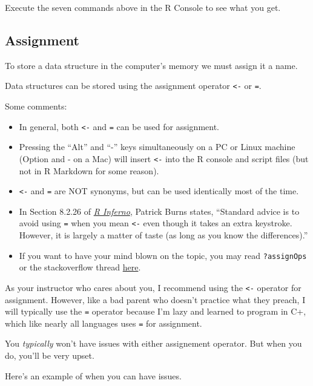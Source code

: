 \documentclass[
]{article}
\providecommand{\tightlist}{%
  \setlength{\itemsep}{0pt}\setlength{\parskip}{0pt}}
\begin{document}
Execute the seven commands above in the R Console to see what you get.

\hypertarget{assignment}{%
\subsection{Assignment}\label{assignment}}

To store a data structure in the computer's memory we must assign it a
name.

Data structures can be stored using the assignment operator
\texttt{\textless{}-} or \texttt{=}.

Some comments:

\begin{itemize}
\tightlist
\item
  In general, both \texttt{\textless{}-} and \texttt{=} can be used for
  assignment.
\item
  Pressing the ``Alt'' and ``-'' keys simultaneously on a PC or Linux
  machine (Option and - on a Mac) will insert \texttt{\textless{}-} into
  the R console and script files (but not in R Markdown for some
  reason).
\item
  \texttt{\textless{}-} and \texttt{=} are NOT synonyms, but can be used
  identically most of the time.
\item
  In Section 8.2.26 of
  \href{http://www.burns-stat.com/pages/Tutor/R_inferno.pdf}{\emph{R
  Inferno}}, Patrick Burns states, ``Standard advice is to avoid using
  \texttt{=} when you mean \texttt{\textless{}-} even though it takes an
  extra keystroke. However, it is largely a matter of taste (as long as
  you know the differences).''
\item
  If you want to have your mind blown on the topic, you may read
  \texttt{?assignOps} or the stackoverflow thread
  \href{https://stackoverflow.com/questions/1741820/what-are-the-differences-between-and-assignment-operators-in-r}{here}.
\end{itemize}

As your instructor who cares about you, I recommend using the
\texttt{\textless{}-} operator for assignment. However, like a bad
parent who doesn't practice what they preach, I will typically use the
\texttt{=} operator because I'm lazy and learned to program in C+, which
like nearly all languages uses \texttt{=} for assignment.

You \emph{typically} won't have issues with either assignement operator.
But when you do, you'll be very upset.

Here's an example of when you can have issues.
\end{document}
